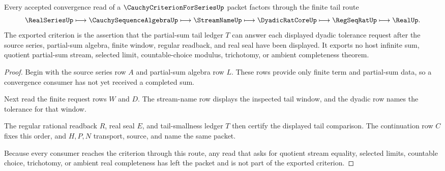 \begin{theorem}
\label{thm:cauchy-criterion-for-series-tail-route}
Every accepted convergence read of a $\CauchyCriterionForSeriesUp$ packet factors through the finite tail route
$$
\RealSeriesUp
\longmapsto
\CauchySequenceAlgebraUp
\longmapsto
\StreamNameUp
\longmapsto
\DyadicRatCoreUp
\longmapsto
\RegSeqRatUp
\longmapsto
\RealUp .
$$
The exported criterion is the assertion that the partial-sum tail ledger $T$ can answer each displayed dyadic tolerance request after the source series, partial-sum algebra, finite window, regular readback, and real seal have been displayed. It exports no host infinite sum, quotient partial-sum stream, selected limit, countable-choice modulus, trichotomy, or ambient completeness theorem.
\end{theorem}
\begin{proof}
Begin with the source series row $A$ and partial-sum algebra row $L$. These rows provide only finite term and partial-sum data, so a convergence consumer has not yet received a completed sum.

Next read the finite request rows $W$ and $D$. The stream-name row displays the inspected tail window, and the dyadic row names the tolerance for that window.

The regular rational readback $R$, real seal $E$, and tail-smallness ledger $T$ then certify the displayed tail comparison. The continuation row $C$ fixes this order, and $H,P,N$ transport, source, and name the same packet.

Because every consumer reaches the criterion through this route, any read that asks for quotient stream equality, selected limits, countable choice, trichotomy, or ambient real completeness has left the packet and is not part of the exported criterion.
\end{proof}



